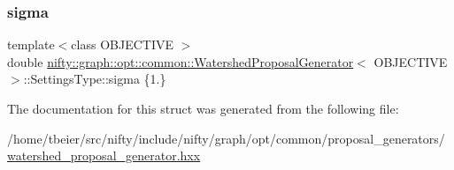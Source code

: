 \subsubsection{\texorpdfstring{sigma}{sigma}}
{\footnotesize\ttfamily template$<$class O\+B\+J\+E\+C\+T\+I\+VE $>$ \\
double \hyperlink{classnifty_1_1graph_1_1opt_1_1common_1_1WatershedProposalGenerator}{nifty\+::graph\+::opt\+::common\+::\+Watershed\+Proposal\+Generator}$<$ O\+B\+J\+E\+C\+T\+I\+VE $>$\+::Settings\+Type\+::sigma \{1.\}}



The documentation for this struct was generated from the following file\+:\begin{DoxyCompactItemize}
\item 
/home/tbeier/src/nifty/include/nifty/graph/opt/common/proposal\+\_\+generators/\hyperlink{common_2proposal__generators_2watershed__proposal__generator_8hxx}{watershed\+\_\+proposal\+\_\+generator.\+hxx}\end{DoxyCompactItemize}
